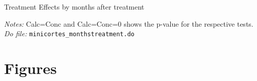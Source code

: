 \documentclass[11pt]{article}
\begin{document}

\pagebreak

\begin{table}[H]
    \caption{Treatment Effects by months after treatment}
    \label{Table_effects_F}
    \begin{center}
    \scriptsize{}
    \end{center}
    \footnotesize
    \textit{Notes:} 
    Calc=Conc and Calc=Conc=0 shows the p-value for the respective tests.
    \textit{Do file: } \texttt{minicortes\_monthstreatment.do}
\end{table}








\pagebreak





\section{Figures}
\end{document}
